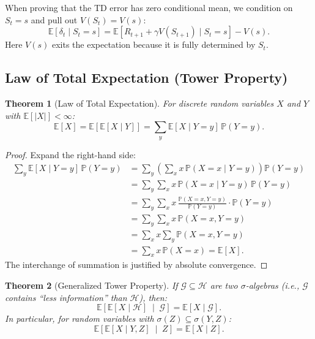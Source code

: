 \documentclass[11pt,a4paper]{article}
\theoremstyle{definition}
\theoremstyle{plain}
\newtheorem{theorem}{Theorem}[section]
\theoremstyle{remark}
\newcommand{\E}{\mathbb{E}}
\newcommand{\Prob}{\mathbb{P}}
\begin{document}
\begin{tdconnection}
When proving that the TD error has zero conditional mean, we condition on $S_t = s$ and pull out $V(S_t) = V(s)$:
\[
    \E[\delta_t \mid S_t = s] = \E[R_{t+1} + \gamma V(S_{t+1}) \mid S_t = s] - V(s).
\]
Here $V(s)$ exits the expectation because it is fully determined by $S_t$.
\end{tdconnection}

\subsection{Law of Total Expectation (Tower Property)}
\label{subsec:tower}

\begin{keyresult}
\begin{theorem}[Law of Total Expectation]
\label{thm:tower}
For discrete random variables $X$ and $Y$ with $\E[|X|] < \infty$:
\begin{equation}
    \E[X] = \E\!\left[\E[X \mid Y]\right] = \sum_y \E[X \mid Y = y]\, \Prob(Y = y).
    \label{eq:tower}
\end{equation}
\end{theorem}
\end{keyresult}

\begin{proof}
Expand the right-hand side:
\begin{align}
    \sum_y \E[X \mid Y = y]\, \Prob(Y = y)
    &= \sum_y \left(\sum_x x\, \Prob(X = x \mid Y = y)\right) \Prob(Y = y) \nonumber\\
    &= \sum_y \sum_x x\, \Prob(X = x \mid Y = y)\, \Prob(Y = y) \nonumber\\
    &= \sum_y \sum_x x\, \frac{\Prob(X = x, Y = y)}{\Prob(Y = y)} \cdot \Prob(Y = y) \nonumber\\
    &= \sum_y \sum_x x\, \Prob(X = x, Y = y) \nonumber\\
    &= \sum_x x \sum_y \Prob(X = x, Y = y) \nonumber\\
    &= \sum_x x\, \Prob(X = x) = \E[X]. \label{eq:tower_proof}
\end{align}
The interchange of summation is justified by absolute convergence.
\end{proof}

\begin{theorem}[Generalized Tower Property]
\label{thm:tower_general}
If $\mathcal{G} \subseteq \mathcal{H}$ are two $\sigma$-algebras (i.e., $\mathcal{G}$ contains ``less information'' than $\mathcal{H}$), then:
\begin{equation}
    \E\!\left[\E[X \mid \mathcal{H}] \;\middle|\; \mathcal{G}\right] = \E[X \mid \mathcal{G}].
    \label{eq:tower_general}
\end{equation}
In particular, for random variables with $\sigma(Z) \subseteq \sigma(Y, Z)$:
\begin{equation}
    \E\!\left[\E[X \mid Y, Z] \;\middle|\; Z\right] = \E[X \mid Z].
    \label{eq:tower_yz}
\end{equation}
\end{theorem}
\end{document}
